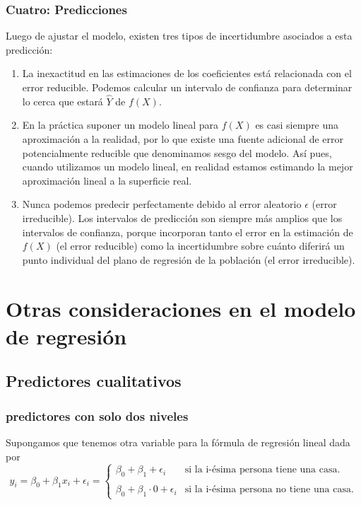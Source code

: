 \subsubsection{Cuatro: Predicciones}
Luego de ajustar el modelo, existen tres tipos de incertidumbre asociados a esta predicción:
\begin{enumerate}[1.]
    \item La inexactitud en las estimaciones de los coeficientes está relacionada con el error reducible. Podemos calcular un intervalo de confianza para determinar lo cerca que estará $\hat{Y}$ de $f(X)$.
    \item  En la práctica suponer un modelo lineal para $f(X)$ es casi siempre una aproximación a la realidad, por lo que existe una fuente adicional de error potencialmente reducible que denominamos sesgo del modelo. Así pues, cuando utilizamos un modelo lineal, en realidad estamos estimando la mejor aproximación lineal a la superficie real.
    \item Nunca podemos predecir perfectamente debido al error aleatorio $\epsilon$ (error irreducible). Los intervalos de predicción son siempre más amplios que los intervalos de confianza, porque incorporan tanto el error en la estimación de $f(X)$ (el error reducible) como la incertidumbre sobre cuánto diferirá un punto individual del plano de regresión de la población (el error irreducible).
\end{enumerate}

\section{Otras consideraciones en el modelo de regresión}

\subsection{Predictores cualitativos}

\subsubsection{predictores con solo dos niveles}

Supongamos que tenemos otra variable para la fórmula de regresión lineal dada por
$$y_i=\beta_0+\beta_1x_i+\epsilon_i
=
\left\{
\begin{array}{ll}
    \beta_0+\beta_1+\epsilon_i & \text{si la i-ésima persona tiene una casa.}\\\\
    \beta_0+\beta_1\cdot 0+\epsilon_i & \text{si la i-ésima persona no tiene una casa.}
\end{array}
\right.
$$

